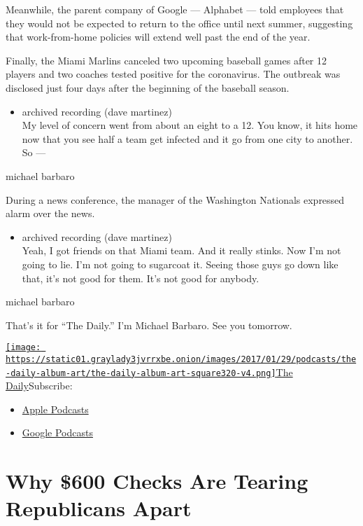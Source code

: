 Meanwhile, the parent company of Google --- Alphabet --- told employees
that they would not be expected to return to the office until next
summer, suggesting that work-from-home policies will extend well past
the end of the year.

Finally, the Miami Marlins canceled two upcoming baseball games after 12
players and two coaches tested positive for the coronavirus. The
outbreak was disclosed just four days after the beginning of the
baseball season.

\begin{itemize}
\tightlist
\item
  archived recording (dave martinez)\\
  My level of concern went from about an eight to a 12. You know, it
  hits home now that you see half a team get infected and it go from one
  city to another. So ---
\end{itemize}

michael barbaro

During a news conference, the manager of the Washington Nationals
expressed alarm over the news.

\begin{itemize}
\tightlist
\item
  archived recording (dave martinez)\\
  Yeah, I got friends on that Miami team. And it really stinks. Now I'm
  not going to lie. I'm not going to sugarcoat it. Seeing those guys go
  down like that, it's not good for them. It's not good for anybody.
\end{itemize}

michael barbaro

That's it for ``The Daily.'' I'm Michael Barbaro. See you tomorrow.

\href{https://www.nytimes3xbfgragh.onion/column/the-daily}{\texttt{[image: https://static01.graylady3jvrrxbe.onion/images/2017/01/29/podcasts/the-daily-album-art/the-daily-album-art-square320-v4.png]}The
Daily}Subscribe:

\begin{itemize}
\tightlist
\item
  \href{https://itunes.apple.com/us/podcast/id1200361736}{Apple
  Podcasts}
\item
  \href{https://www.google.com/podcasts?feed=aHR0cHM6Ly9yc3MuYXJ0MTkuY29tL3RoZS1kYWlseQ\%3D\%3D}{Google
  Podcasts}
\end{itemize}

\hypertarget{why-600-checks-are-tearing-republicans-apart-1}{%
\section{Why \$600 Checks Are Tearing Republicans
Apart}\label{why-600-checks-are-tearing-republicans-apart-1}}


